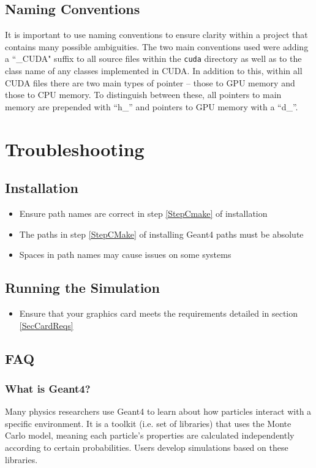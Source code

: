 \documentclass[12pt]{article}
\begin{document}
\subsection{Naming Conventions} %
It is important to use naming conventions to ensure clarity within a project that contains many possible ambiguities. The two main conventions used were adding a ``\_CUDA" suffix to all source files within the \texttt{cuda} directory as well as to the class name of any classes implemented in CUDA. In addition to this, within all CUDA files there are two main types of pointer -- those to GPU memory and those to CPU memory. To distinguish between these, all pointers to main memory are prepended with ``h\_'' and pointers to GPU memory with a ``d\_''.

\section{Troubleshooting}\label{SecTroubleshooting} %
\subsection{Installation} %
\begin{itemize}
\item Ensure path names are correct in step \ref{StepCmake} of installation
\item The paths in step \ref{StepCMake} of installing Geant4 paths must be absolute
\item Spaces in path names may cause issues on some systems
\end{itemize}

\subsection{Running the Simulation} %
\begin{itemize}
\item Ensure that your graphics card meets the requirements detailed in section \ref{SecCardReqs}
\end{itemize}

\subsection{FAQ} %
\subsubsection{What is Geant4?}\label{SecBackground}
Many physics researchers use Geant4 to learn about how particles interact with a specific environment. It is a toolkit (i.e. set of libraries) that uses the Monte Carlo model, meaning each particle's properties are calculated independently according to certain probabilities. Users develop simulations based on these libraries.
\end{document}
